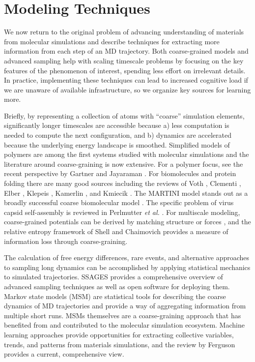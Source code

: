 \section{Modeling Techniques}\label{techniques}
We now return to the original problem of advancing understanding of materials from molecular simulations and describe techniques for extracting more information from each step of an MD trajectory.
Both coarse-grained models and advanced sampling help with scaling timescale problems by focusing on the key features of the phenomenon of interest, spending less effort on irrelevant details.
In practice, implementing these techniques can lead to increased cognitive load if we are unaware of available infrastructure, so we organize key sources for learning more.

Briefly, by representing a collection of atoms with ``coarse'' simulation elements, significantly longer timescales are accessible because a) less computation is needed to compute the next configuration, and b) dynamics are accelerated because the underlying energy landscape is smoothed.
Simplified models of polymers are among the first systems studied with molecular simulations \cite{Richter1981,Kremer1990} and the literature around coarse-graining is now extensive.
For a polymer focus, see the recent perspective by Gartner and Jayaraman \cite{Gartner2019}.
For biomolecules and protein folding there are many good sources including the reviews of Voth \cite{Voth2008}, Clementi \cite{Clementi2008}, Elber \cite{Elber2005}, Klepeis \cite{Klepeis2009}, Kamerlin \cite{Kamerlin2011}, and Kmiecik \cite{Kmiecik2016}.
The MARTINI model stands out as a broadly successful coarse biomolecular model \cite{Marrink2014}.
The specific problem of virus capsid self-assembly is reviewed in Perlmutter \textit{et al.} \cite{Perlmutter2014}.
For multiscale modeling, coarse-grained potentials can be derived by matching structure \cite{Moore2014} or forces \cite{Lu2013,Wang2014j}, and the relative entropy framework of Shell and Chaimovich \cite{Shell2008,Chaimovich2010} provides a measure of information loss through coarse-graining. 

The calculation of free energy differences, rare events, and alternative approaches to sampling long dynamics can be accomplished by applying statistical mechanics to simulated trajectories.
SSAGES \cite{Sidky2018} provides a comprehensive overview of advanced sampling techniques as well as open software for deploying them.
Markov state models (MSM) \cite{Husic2018} are statistical tools for describing the coarse dynamics of MD trajectories and provide a way of aggregating information from multiple short runs.
MSMs themselves are a coarse-graining approach that has benefited from and contributed to the molecular simulation ecosystem. 
Machine learning approaches provide opportunities for extracting collective variables, trends, and patterns from materials simulations, and the review by Ferguson \cite{Ferguson2018} provides a current, comprehensive view.

